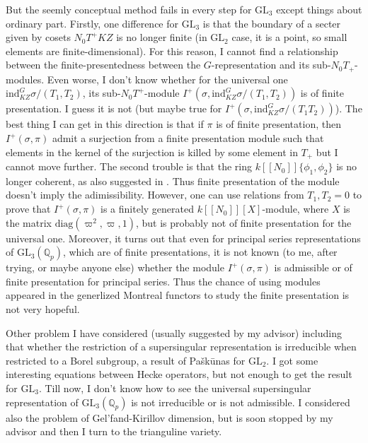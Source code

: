 \documentclass{amsart}
\newcommand{\Q}{\mathbb{Q}}
\newcommand{\GL}{\text{GL}}
\newcommand{\ind}{\text{ind}}
\numberwithin{equation}{section}
\begin{document}
But the seemly conceptual method fails in every step for $\GL_3$ except things about ordinary part. Firstly, one difference for $\GL_3$ is that the boundary of a secter given by cosets $N_0T^+KZ$ is no longer finite (in $\GL_2$ case, it is a point, so small elements are finite-dimensional). For this reason, I cannot find a relationship between the finite-presentedness between the $G$-representation and its sub-$N_0T_+$-modules. Even worse, I don't know whether for the universal one $\ind_{KZ}^G\sigma/(T_1,T_2)$, its sub-$N_0T^+$-module $I^+(\sigma, \ind_{KZ}^G\sigma/(T_1,T_2))$ is of finite presentation. I guess it is not (but maybe true for $I^+(\sigma, \ind_{KZ}^G\sigma/(T_1T_2))$). The best thing I can get in this direction is that if $\pi$ is of finite presentation, then $I^+(\sigma,\pi)$ admit a surjection from a finite presentation module such that elements in the kernel of the surjection is killed by some element in $T_+$ but I cannot move further. The second trouble is that the ring $k[[N_0]]\{\phi_1,\phi_2\}$ is no longer coherent, as also suggested in \cite{zabradi2018multivariable}. Thus finite presentation of the module doesn't imply the adimissibility. However, one can use relations from $T_1,T_2=0$ to prove that $I^+(\sigma,\pi)$ is a finitely generated $k[[N_0]][X]$-module, where $X$ is the matrix $\text{diag}(\varpi^2,\varpi,1)$, but is probably not of finite presentation for the universal one. Moreover, it turns out that even for principal series representations of $\GL_3(\Q_p)$, which are of finite presentations, it is not known (to me, after trying, or maybe anyone else) whether the module $I^+(\sigma,\pi)$ is admissible or of finite presentation for principal series. Thus the chance of using modules appeared in the generlized Montreal functors to study the finite presentation is not very hopeful.\par
Other problem I have considered (usually suggested by my advisor) including that whether the restriction of a supersingular representation is irreducible when restricted to a Borel subgroup, a result of Pa{\v{s}}k{\=u}nas for $\GL_2$. I got some interesting equations between Hecke operators, but not enough to get the result for $\GL_3$. Till now, I don't know how to see the universal supersingular representation of $\GL_3(\Q_p)$ is not irreducible or is not admissible. I considered also the problem of Gel'fand-Kirillov dimension, but is soon stopped by my advisor and then I turn to the trianguline variety.
\end{document}
